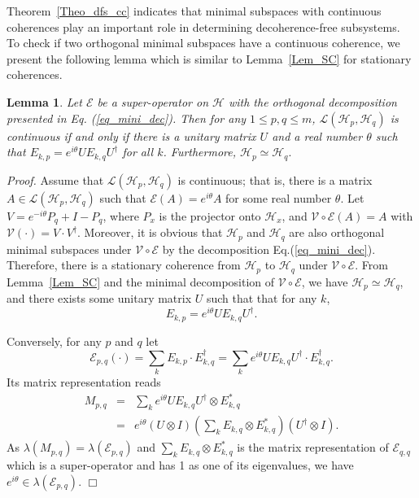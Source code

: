 \documentclass[journal]{IEEEtran}
\def\h{\ensuremath{\mathcal{H}}}
\def\l{\ensuremath{\mathcal{L}}}
\def\v{\ensuremath{\mathcal{V}}}
\def\e{\ensuremath{\mathcal{E}}}
\def\l{\ensuremath{\mathcal{L}}}
\def\l{\mathcal{L}}
\newtheorem{lemma}{Lemma}
\begin{document}
Theorem~\ref{Theo_dfs_cc} indicates that minimal subspaces with continuous coherences play an important role in determining decoherence-free subsystems. To check if two orthogonal minimal subspaces have a continuous coherence, we present the following lemma which is similar to Lemma~\ref{Lem_SC} for stationary coherences.

\begin{lemma}\label{lem_block_eq}
  Let $\e$ be a super-operator on $\h$ with the orthogonal decomposition presented in Eq. (\ref{eq_mini_dec}). Then for any $1\leq p, q\leq m$, $\l(\h_p,\h_q)$ is continuous if and only if there is a unitary matrix $U$ and a real number $\theta$ such that 
  $E_{k,p}=e^{i\theta}UE_{k,q}U^\dagger$ for all $k$.
  Furthermore, $\h_p\simeq\h_q.$ 
\end{lemma}
{\it Proof.} 
Assume that $\l(\h_p,\h_q)$ is continuous; that is,  there is a matrix $A\in \l(\h_p,\h_q)$ such that $\e(A)=e^{i\theta}A$ for some real number $\theta$. Let $V=e^{-i\theta}P_q+I-P_q$, where $P_x$ is the projector onto $\h_x$,  and  $\v\circ\e(A)=A$ with $\v(\cdot)=V\cdot V^\dagger$. Moreover, it is obvious that $\h_p$ and $\h_q$ are also orthogonal minimal subspaces under $\v\circ\e$  by the decomposition Eq.(\ref{eq_mini_dec}). Therefore, there is a stationary coherence from $\h_p$ to $\h_q$ under $\v\circ\e.$ From Lemma~\ref{Lem_SC} and the minimal decomposition of $\v\circ\e$, we have $\h_p\simeq\h_q$, and there exists some unitary matrix $U$ such that that for any $k$,
$$E_{k,p}=e^{i\theta}UE_{k,q}U^\dagger.$$ 

Conversely, for any $p$ and $q$ let $$\e_{p,q}(\cdot)=\sum_{k}E_{k,p}\cdot E_{k,q}^\dagger=\sum_{k}e^{i\theta}UE_{k,q}U^\dagger\cdot E_{k,q}^\dagger.$$ 
Its matrix representation \cite{guan2016decomposition} reads
\begin{eqnarray*}
  M_{p,q}&=&\sum_k e^{i\theta}UE_{k,q}U^\dagger\otimes E_{k,q}^{*}\\
  &=&e^{i\theta}(U\otimes I)\left(\sum_k E_{k,q}\otimes E_{k,q}^{*}\right)(U^\dagger\otimes I).
\end{eqnarray*}
As $\lambda(M_{p,q})=\lambda(\e_{p,q})$ and $\sum_k E_{k,q}\otimes E_{k,q}^{*}$ is the matrix representation of $\e_{q,q}$ which is a super-operator and has 1 as one of its eigenvalues, we have $e^{i\theta}\in\lambda(\e_{p,q}).$  
\hfill $\Box$
\end{document}
